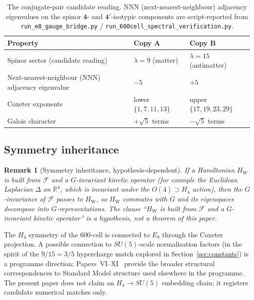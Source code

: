 \documentclass[12pt]{article}
\newtheorem{remark}[theorem]{Remark}
\newcommand{\Fcal}{\mathcal{F}}
\newcommand{\HW}{H_{\mathrm{W}}}
\begin{document}
\begin{table}[ht]
\centering
\caption{The conjugate-pair candidate reading. NNN (next-nearest-neighbour) adjacency eigenvalues on the spinor $\mathbf{4}$- and $\mathbf{4'}$-isotypic components are script-reported from \texttt{run\_e8\_gauge\_bridge.py} / \texttt{run\_600cell\_spectral\_verification.py}.}
\label{tab:conjugate}
\begin{tabular}{@{}lll@{}}
\toprule
Property & Copy A & Copy B \\
\midrule
Spinor sector (candidate reading) & $\lambda = 9$ (matter) & $\lambda = 15$ (antimatter) \\
Next-nearest-neighbour (NNN) adjacency eigenvalue & $-5$ & $+5$ \\
Coxeter exponents & lower $\{1,7,11,13\}$ & upper $\{17,19,23,29\}$ \\
Galois character & $+\sqrt{5}$ terms & $-\sqrt{5}$ terms \\
\bottomrule
\end{tabular}
\end{table}

\subsection{Symmetry inheritance}

\begin{remark}[Symmetry inheritance, hypothesis-dependent]\label{rem:symmetry}
If a Hamiltonian $\HW$ is built from $\Fcal$ and a $G$-invariant kinetic operator (for example the Euclidean Laplacian $\Delta$ on $\mathbb{R}^4$, which is invariant under the $O(4) \supset H_4$ action), then the $G$-invariance of $\Fcal$ passes to $\HW$, so $\HW$ commutes with $G$ and its eigenspaces decompose into $G$-representations. The clause ``$\HW$ is built from $\Fcal$ and a $G$-invariant kinetic operator'' is a hypothesis, not a theorem of this paper.
\end{remark}

The $H_4$ symmetry of the 600-cell is connected to $E_8$ through the Coxeter projection. A possible connection to $SU(5)$-scale normalisation factors (in the spirit of the $9/15 = 3/5$ hypercharge match explored in Section~\ref{sec:constants}) is a programme direction; Papers~VI--XI~\citep{SmartVI, SmartXI} provide the broader structural correspondences to Standard Model structure used elsewhere in the programme. The present paper does not claim an $H_4 \to SU(5)$ embedding chain; it registers candidate numerical matches only.
\end{document}
